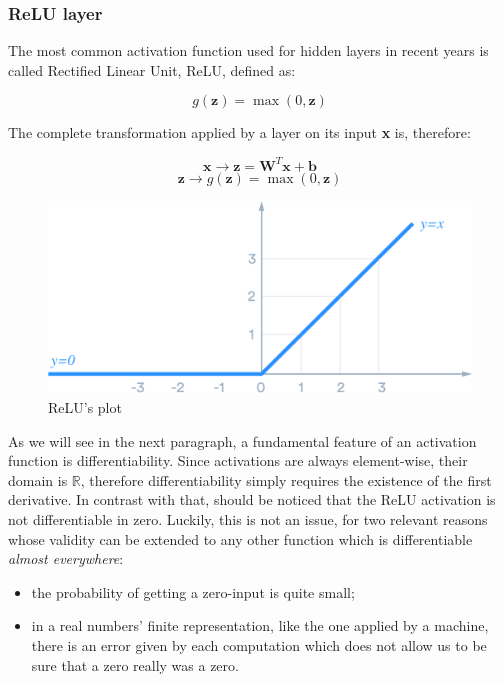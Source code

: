 \documentclass[a4paper, twoside]{article}
\begin{document}
        \subsubsection{ReLU layer}
        The most common activation function used for hidden layers in recent years is called Rectified Linear Unit, ReLU, defined as:

        $$g(\boldsymbol{z}) = \max(0, \boldsymbol{z}) $$

        The complete transformation applied by a layer on its input \textbf{x} is, therefore:

        $$\boldsymbol{x} \rightarrow \boldsymbol{z} = \boldsymbol{W}^T \boldsymbol{x} + \boldsymbol{b} $$
        $$\boldsymbol{z} \rightarrow g(\boldsymbol{z}) =\max(0, \boldsymbol{z}) $$


        \begin{figure}
            \includegraphics[width=1\linewidth]{relu.png}
            \caption{ReLU's plot}
            \label{fig:relu}
        \end{figure}

        As we will see in the next paragraph, a fundamental feature of an activation function is differentiability. Since activations are always element-wise, their domain is $\mathbb{R}$, therefore differentiability simply requires the existence of the first derivative. In contrast with that, should be noticed that the ReLU activation is not differentiable in zero. Luckily, this is not an issue, for two relevant reasons whose validity can be extended to any other function which is differentiable \textit{almost everywhere}:

        \begin{itemize}
            \item the probability of getting a zero-input is quite small;
            \item in a real numbers' finite representation, like the one applied by a machine, there is an error given by each computation which does not allow us to be sure that a zero really was a zero.
        \end{itemize}
\end{document}
